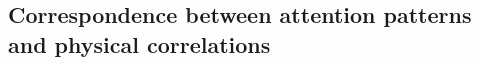 \documentclass[pdflatex,sn-nature]{sn-jnl}%
\theoremstyle{thmstyleone}%
\theoremstyle{thmstyletwo}%
\theoremstyle{thmstylethree}%
\begin{document}





\subsection{Correspondence between attention patterns and physical correlations}
\end{document}
